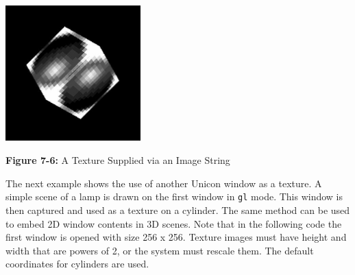 \bigskip

{\centering 
\includegraphics[width=2.0508in,height=2.0571in]{ub-img/ub-img36.jpg}
\par}

{\sffamily\bfseries Figure 7-6:}
{\sffamily A Texture Supplied via an Image String}

\bigskip


The next example shows the use of another Unicon window as a texture. A
simple scene of a lamp is drawn on the first window in
{\textquotedbl}\texttt{gl{\textquotedbl}} mode. This window is then
captured and used as a texture on a cylinder. The same method can be
used to embed 2D window contents in 3D scenes. Note that in the
following code the first window is opened with size 256 x 256. Texture
images must have height and width that are powers of 2, or the system
must rescale them. The default coordinates for cylinders are used.

